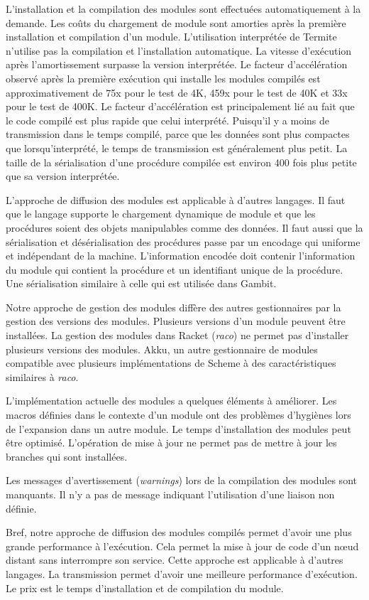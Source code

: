 L'installation et la compilation des modules sont effectuées automatiquement à
la demande.  Les coûts du chargement de module sont amorties après la première
installation et compilation d'un module. L'utilisation interprétée de Termite
n'utilise pas la compilation et l'installation automatique.  La vitesse
d'exécution après l'amortissement surpasse la version interprétée.  Le facteur
d'accélération observé après la première exécution qui installe les modules
compilés est approximativement de 75x pour le test de 4K, 459x pour le test de
40K et 33x pour le test de 400K.  Le facteur d'accélération est principalement
lié au fait que le code compilé est plus rapide que celui interprété.
Puisqu'il y a moins de transmission dans le temps compilé, parce que les
données sont plus compactes que lorsqu'interprété, le temps de transmission est
généralement plus petit. La taille de la sérialisation d'une procédure compilée
est environ 400 fois plus petite que sa version interprétée.

L'approche de diffusion des modules est applicable à d'autres langages.
Il faut que le langage supporte le chargement dynamique de module et
que les procédures soient des objets manipulables comme des données.
Il faut aussi que la sérialisation et désérialisation des procédures
passe par un encodage qui uniforme et indépendant de la machine.
L'information encodée doit contenir l'information du module qui contient
la procédure et un identifiant unique de la procédure. Une
sérialisation similaire à celle qui est utilisée dans Gambit.

Notre approche de gestion des modules diffère des autres gestionnaires par la
gestion des versions des modules. Plusieurs versions d'un module peuvent être
installées. La gestion des modules dans Racket (\textit{raco}) ne permet pas
d'installer plusieurs versions des modules. Akku, un autre gestionnaire de modules
compatible avec plusieurs implémentations de Scheme à des caractéristiques
similaires à \textit{raco}.

L'implémentation actuelle des modules a quelques éléments à améliorer.
Les macros définies dans le contexte d'un module ont des problèmes d'hygiènes
lors de l'expansion dans un autre module. Le temps d'installation des modules
peut être optimisé. L'opération de mise à jour ne permet pas de mettre
à jour les branches qui sont installées.

Les messages d'avertissement (\textit{warnings}) lors de la compilation
des modules sont manquants. Il n'y a pas de message indiquant l'utilisation
d'une liaison non définie.


Bref, notre approche de diffusion des modules compilés permet d'avoir une
plus grande performance à l'exécution. Cela permet la mise à jour de
code d'un nœud distant sans interrompre son service. Cette approche
est applicable à d'autres langages. La transmission permet d'avoir
une meilleure performance d'exécution. Le prix est le temps d'installation
et de compilation du module.



